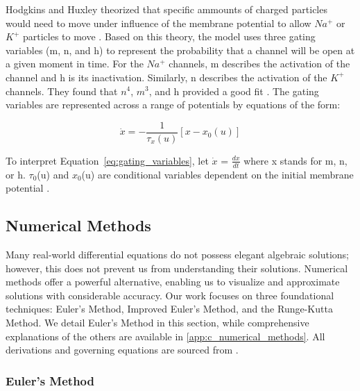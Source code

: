 \documentclass{article} %
\begin{document}
\begin{multicols}{2}
Hodgkins and Huxley theorized that specific ammounts of charged particles would need to move under influence of the membrane potential to allow $Na^+$ or $K^+$ particles to move \cite{Schwiening2012}.
Based on this theory, the model uses three gating variables (m, n, and h) to represent the probability that a channel will be open at a given moment in time. 
For the $Na^+$ channels, m describes the activation of the channel and h is its inactivation. 
Similarly, n describes the activation of the $K^+$ channels.
They found that $n^4$, $m^3$, and h provided a good fit \cite{Schwiening2012}. 
The gating variables are represented across a range of potentials by equations of the form:

\begin{dmath}
    \dot{x} = -\frac{1}{\tau_{x}(u)}[x - x_{0}(u)]
    \label{eq:gating_variables}
\end{dmath}

To interpret Equation~\ref{eq:gating_variables}, let $\dot{x}$ = $\frac{dx}{dt}$ where x stands for m, n, or h. $\tau_0$(u) and $x_0$(u) are conditional variables dependent on the initial membrane potential \cite{Gerstner2014}.

\subsection{Numerical Methods}
\label{subsec:numerical_methods}

Many real-world differential equations do not possess elegant algebraic solutions; however, this does not prevent us from understanding their solutions. 
Numerical methods offer a powerful alternative, enabling us to visualize and approximate solutions with considerable accuracy. 
Our work focuses on three foundational techniques: Euler's Method, Improved Euler's Method, and the Runge-Kutta Method. 
We detail Euler's Method in this section, while comprehensive explanations of the others are available in \ref{app:c_numerical_methods}. 
All derivations and governing equations are sourced from \cite{brannan2015differential}.

\subsubsection{Euler's Method}
\label{subsubsec:euler_method}


\end{multicols}
\end{document}
